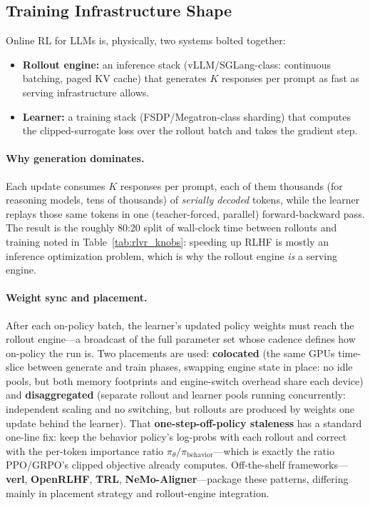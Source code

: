 \subsection{Training Infrastructure Shape}
\label{sec:rlhf_infra}

Online RL for LLMs is, physically, two systems bolted together:

\begin{itemize}[leftmargin=*]
\item \textbf{Rollout engine:} an inference stack (vLLM/SGLang-class:
  continuous batching, paged KV cache) that generates $K$ responses per
  prompt as fast as serving infrastructure allows.
\item \textbf{Learner:} a training stack (FSDP/Megatron-class sharding)
  that computes the clipped-surrogate loss over the rollout batch and
  takes the gradient step.
\end{itemize}

\paragraph{Why generation dominates.}
Each update consumes $K$ responses per prompt, each of them thousands
(for reasoning models, tens of thousands) of \emph{serially decoded}
tokens,
while the learner replays those same tokens in one (teacher-forced,
parallel) forward-backward pass.  The result is the roughly 80:20 split
of wall-clock time between rollouts and training noted in
Table~\ref{tab:rlvr_knobs}: speeding up RLHF is mostly an inference
optimization problem, which is why the rollout engine \emph{is} a
serving engine.

\paragraph{Weight sync and placement.}
After each on-policy batch, the learner's updated policy weights must
reach the rollout engine---a broadcast of the full parameter set whose
cadence defines how on-policy the run is.  Two placements are used:
\textbf{colocated} (the same GPUs time-slice between generate and train
phases, swapping engine state in place: no idle pools, but both memory
footprints and engine-switch overhead share each device) and
\textbf{disaggregated} (separate rollout and learner pools running
concurrently: independent scaling and no switching, but rollouts are
produced by weights one update behind the learner).  That
\textbf{one-step-off-policy staleness} has a standard one-line fix: keep
the behavior policy's log-probs with each rollout and correct with the
per-token importance ratio $\pi_\theta / \pi_{\text{behavior}}$---which
is exactly the ratio PPO/GRPO's clipped objective already computes.
Off-the-shelf frameworks---\textbf{verl}, \textbf{OpenRLHF},
\textbf{TRL}, \textbf{NeMo-Aligner}---package these patterns, differing
mainly in placement strategy and rollout-engine integration.

